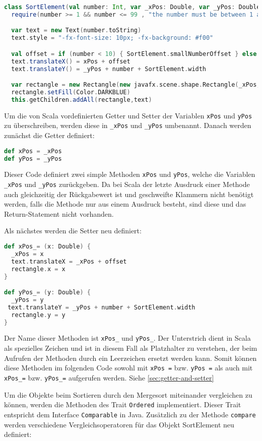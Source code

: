 \begin{lstlisting}[language=Scala]
class SortElement(val number: Int, var _xPos: Double, var _yPos: Double) extends Group with Ordered[SortElement]  {
  require(number >= 1 && number <= 99 , "the number must be between 1 and 99 (inclusive)")

  var text = new Text(number.toString)
  text.style = "-fx-font-size: 10px; -fx-background: #f00"

  val offset = if (number < 10) { SortElement.smallNumberOffset } else { 0 }
  text.translateX() = xPos + offset
  text.translateY() = _yPos + number + SortElement.width

  var rectangle = new Rectangle(new javafx.scene.shape.Rectangle(_xPos, _yPos, SortElement.width, number))
  rectangle.setFill(Color.DARKBLUE)
  this.getChildren.addAll(rectangle,text)
\end{lstlisting}

Um die von Scala vordefinierten Getter und Setter der Variablen \texttt{xPos} und \texttt{yPos} zu überschreiben, werden diese in \texttt{\_xPos} und
\texttt{\_yPos} umbenannt. Danach werden zunächst die Getter definiert:

\begin{lstlisting}[language=Scala,caption=Definiert die Setter Methoden]
def xPos = _xPos
def yPos = _yPos
\end{lstlisting}

Dieser Code definiert zwei simple Methoden \texttt{xPos} und \texttt{yPos}, welche die Variablen \texttt{\_xPos} und \texttt{\_yPos} zurückgeben. Da bei Scala der letzte Ausdruck einer Methode auch gleichzeitig der Rückgabewert ist und geschweifte Klammern nicht benötigt werden, falls die Methode nur aus einem Ausdruck besteht, sind diese und das Return-Statement nicht vorhanden.

Als nächstes werden die Setter neu definiert:

\begin{lstlisting}[language=Scala]
def xPos_= (x: Double) {
  _xPos = x
  text.translateX = _xPos + offset
  rectangle.x = x
}

def yPos_= (y: Double) {
  _yPos = y
 text.translateY = _yPos + number + SortElement.width
  rectangle.y = y
}
\end{lstlisting}

Der Name dieser Methoden ist \texttt{xPos\_} und \texttt{yPos\_}. Der Unterstrich dient in Scala als spezielles Zeichen und ist in diesem Fall als Platzhalter zu verstehen, der beim Aufrufen der Methoden durch ein Leerzeichen ersetzt werden kann. Somit können diese Methoden im folgenden Code sowohl mit \texttt{xPos =}  bzw. \texttt{yPos =} als auch mit \texttt{xPos\_=} bzw. \texttt{yPos\_=} aufgerufen werden. Siehe \ref{sec:getter-and-setter}

Um die Objekte beim Sortieren durch den Mergesort miteinander vergleichen zu können, werden die Methoden des Trait \texttt{Ordered} implementiert. Dieser Trait entspricht dem Interface \texttt{Comparable} in Java. Zusätzlich zu der Methode \texttt{compare} werden verschiedene Vergleichsoperatoren für das Objekt SortElement neu definiert:
